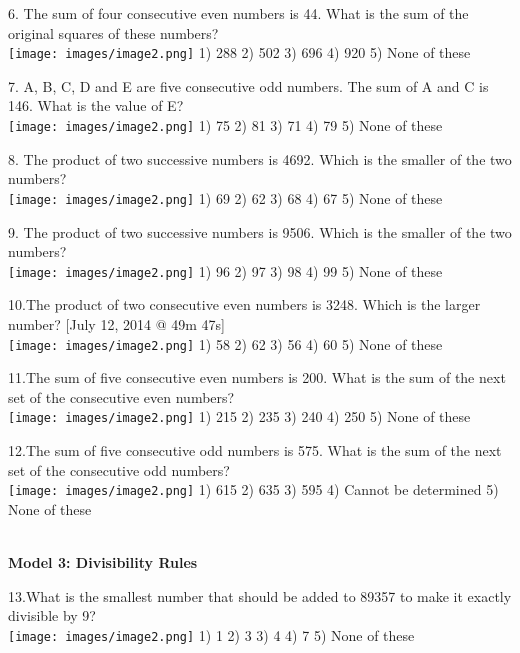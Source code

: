 \documentclass[
]{article}
\begin{document}
6. The sum of four consecutive even numbers is 44. What is the sum of the original squares of these numbers?\\
\texttt{[image: images/image2.png]} 1) 288 	2) 502 	3) 696 	4) 920 	5) None of these

7. A, B, C, D and E are five consecutive odd numbers. The sum of A and C is 146. What is the value of E?\\
\texttt{[image: images/image2.png]} 1) 75 	2) 81 	3) 71 	4) 79 	5) None of these

8. The product of two successive numbers is 4692. Which is the smaller of the two numbers?\\
\texttt{[image: images/image2.png]}  1) 69 	2) 62 	3) 68 	4) 67 	5) None of these

9. The product of two successive numbers is 9506. Which is the smaller of the two numbers?\\
\texttt{[image: images/image2.png]} 1) 96 	2) 97 	3) 98 	4) 99 	5) None of these

10.The product of two consecutive even numbers is 3248. Which is the larger number? [July 12, 2014 @ 49m 47s] \\
\texttt{[image: images/image2.png]} 1) 58 	2) 62 	3) 56 	4) 60 	5) None of these

11.The sum of five consecutive even numbers is 200. What is the sum of the next set of the consecutive even numbers?\\
\texttt{[image: images/image2.png]} 1) 215 2) 235 3) 240 4) 250 5) None of these

12.The sum of five consecutive odd numbers is 575. What is the sum of the next set of the consecutive odd numbers?\\
\texttt{[image: images/image2.png]} 1) 615 2) 635 3) 595 4) Cannot be determined 5) None of these

\textbf{ \\ Model 3: Divisibility Rules \\ }

13.What is the smallest number that should be added to 89357 to make it exactly divisible by 9?\\
\texttt{[image: images/image2.png]}  1) 1 	2) 3 	3) 4 	4) 7 	5) None of these
\end{document}
